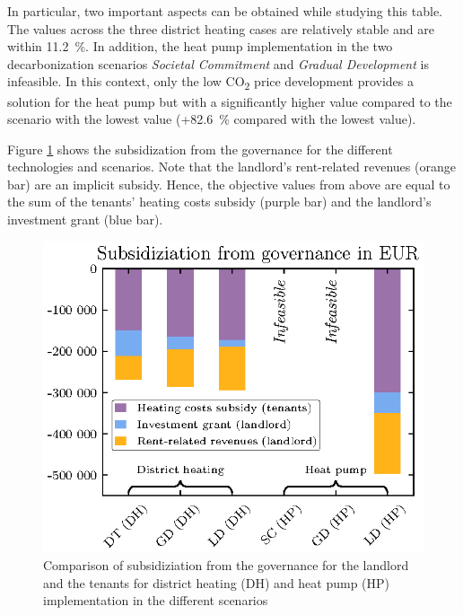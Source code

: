 In particular, two important aspects can be obtained while studying this table. The values across the three district heating cases are relatively stable and are within \SI{11.2}{\%}. In addition, the heat pump implementation in the two decarbonization scenarios \textit{Societal Commitment} and \textit{Gradual Development} is infeasible. In this context, only the low CO\textsubscript{2} price development provides a solution for the heat pump but with a significantly higher value compared to the scenario with the lowest value (+\SI{82.6}{\%} compared with the lowest value).\vspace{0.5cm}

Figure \ref{fig:npv_comparison} shows the subsidization from the governance for the different technologies and scenarios. Note that the landlord's rent-related revenues (orange bar) are an implicit subsidy. Hence, the objective values from above are equal to the sum of the tenants' heating costs subsidy (purple bar) and the landlord's investment grant (blue bar). 

\begin{figure}[h]
	\centering
	\includegraphics[width=0.7\linewidth]{figures/4_Results/fig_npv_comparison/net_present_value.eps}
	\caption{Comparison of subsidiziation from the governance for the landlord and the tenants for district heating (DH) and heat pump (HP) implementation in the different scenarios}
	\label{fig:npv_comparison}
\end{figure}

